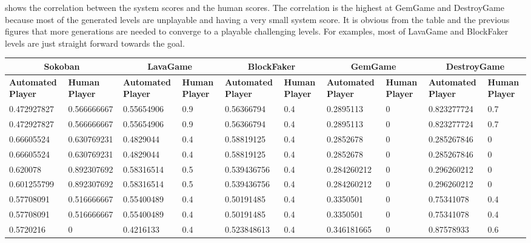  shows the correlation between the system scores and the human scores. The correlation is the highest at GemGame and DestroyGame because most of the generated levels are unplayable and having a very small system score. It is obvious from the table and the previous figures that more generations are needed to converge to a playable challenging levels. For examples, most of LavaGame and BlockFaker levels are just straight forward towards the goal.

\begin{landscape}
\begin{table}[!ht]
	\centering
	\begin{tabular}{|p{0.8in}|p{0.8in}|p{0.8in}|p{0.8in}|p{0.8in}|p{0.8in}|p{0.8in}|p{0.8in}|p{0.8in}|p{0.8in}|}
		\hline
		\multicolumn{2}{c}{\textbf{Sokoban}} & \multicolumn{2}{c}{\textbf{LavaGame}} & \multicolumn{2}{c}{\textbf{\textbf{BlockFaker}}} & \multicolumn{2}{c}{\textbf{GemGame}} & \multicolumn{2}{c}{\textbf{DestroyGame}}\\
		\hline
		\textbf{Automated Player} & \textbf{Human Player} & \textbf{Automated Player} & \textbf{Human Player} & \textbf{Automated Player} & \textbf{Human Player} & \textbf{Automated Player} & \textbf{Human Player} & \textbf{Automated Player} & \textbf{Human Player}\\
		\hline
		0.472927827 & 0.566666667 & 0.55654906 & 0.9 & 0.56366794 & 0.4 & 0.2895113 & 0 & 0.823277724 & 0.7\\
		\hline
		0.472927827 & 0.566666667 & 0.55654906 & 0.9 & 0.56366794 & 0.4 & 0.2895113 & 0 & 0.823277724 & 0.7\\
		\hline
		0.66605524 & 0.630769231 & 0.4829044 & 0.4 & 0.58819125 & 0.4 & 0.2852678 & 0 & 0.285267846 & 0\\
		\hline
		0.66605524 & 0.630769231 & 0.4829044 & 0.4 & 0.58819125 & 0.4 & 0.2852678 & 0 & 0.285267846 & 0\\
		\hline
		0.620078 & 0.892307692 & 0.58316514 & 0.5 & 0.539436756 & 0.4 & 0.284260212 & 0 & 0.296260212 & 0\\
		\hline
		0.601255799 & 0.892307692 & 0.58316514 & 0.5 & 0.539436756 & 0.4 & 0.284260212 & 0 & 0.296260212 & 0\\
		\hline
		0.57708091 & 0.516666667 & 0.55400489 & 0.4 & 0.50191485 & 0.4 & 0.3350501 & 0 & 0.75341078 & 0.4\\
		\hline
		0.57708091 & 0.516666667 & 0.55400489 & 0.4 & 0.50191485 & 0.4 & 0.3350501 & 0 & 0.75341078 & 0.4\\
		\hline
		0.5720216 & 0 & 0.4216133 & 0.4 & 0.523848613 & 0.4 & 0.346181665 & 0 & 0.87578933 & 0.6\\

\end{tabular}
\end{table}
\end{landscape}
